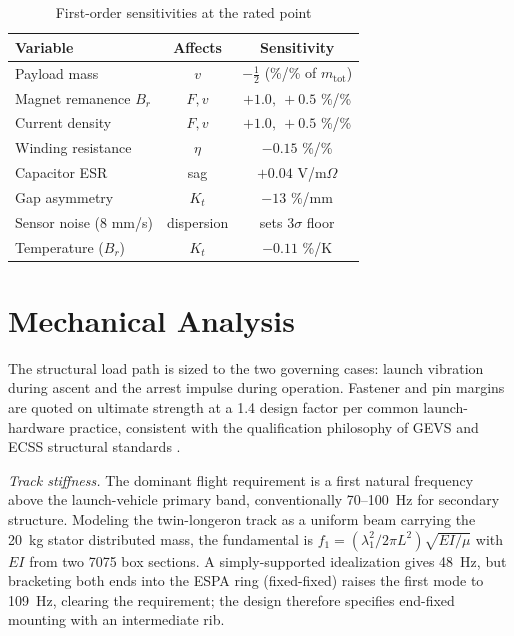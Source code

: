 \documentclass[conference]{IEEEtran}
\begin{document}
\begin{table}[t]
\caption{First-order sensitivities at the rated point}
\label{tab:sens}
\centering\footnotesize
\begin{tabular}{lcc}
\toprule
Variable & Affects & Sensitivity\\
\midrule
Payload mass & $v$ & $-\tfrac{1}{2}$ (\%/\% of $m_{\mathrm{tot}}$)\\
Magnet remanence $B_r$ & $F,v$ & $+1.0,\ +0.5$ \%/\%\\
Current density & $F,v$ & $+1.0,\ +0.5$ \%/\%\\
Winding resistance & $\eta$ & $-0.15$ \%/\%\\
Capacitor ESR & sag & $+0.04$ V/m$\Omega$\\
Gap asymmetry & $K_t$ & $-13$ \%/mm\\
Sensor noise (8 mm/s) & dispersion & sets 3$\sigma$ floor\\
Temperature ($B_r$) & $K_t$ & $-0.11$ \%/K\\
\bottomrule
\end{tabular}
\end{table}

\section{Mechanical Analysis}\label{sec:mech}
The structural load path is sized to the two governing cases: launch vibration during ascent and the arrest impulse during operation. Fastener and pin margins are quoted on ultimate strength at a 1.4 design factor per common launch-hardware practice, consistent with the qualification philosophy of GEVS \cite{gevs} and ECSS structural standards \cite{ecss}.

\emph{Track stiffness.} The dominant flight requirement is a first natural frequency above the launch-vehicle primary band, conventionally 70--100~Hz for secondary structure. Modeling the twin-longeron track as a uniform beam carrying the 20~kg stator distributed mass, the fundamental is $f_1=(\lambda_1^2/2\pi L^2)\sqrt{EI/\mu}$ with $EI$ from two 7075 box sections. A simply-supported idealization gives 48~Hz, but bracketing both ends into the ESPA ring (fixed-fixed) raises the first mode to 109~Hz, clearing the requirement; the design therefore specifies end-fixed mounting with an intermediate rib.
\end{document}
